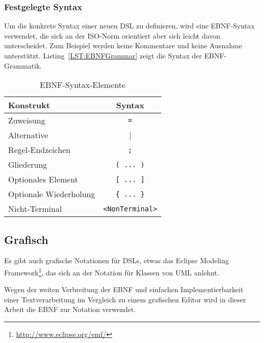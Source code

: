 \documentclass[../InterneDSLs.tex]{subfiles}
\begin{document}
\subsubsection{Festgelegte Syntax}
Um die konkrete Syntax einer neuen DSL zu definieren, wird eine EBNF-Syntax verwendet, die sich an der ISO-Norm orientiert aber sich leicht davon unterscheidet. Zum Beispiel werden keine Kommentare und keine Ausnahme unterstützt. Listing~\ref{LST:EBNFGrammar} zeigt die Syntax der EBNF-Grammatik.

\begin{figure}[ht]

\end{figure}

\begin{table}[ht]
\centering
\begin{tabular}{l|c}
\textbf{Konstrukt}     & \textbf{Syntax}\\\hline
Zuweisung              & \verb|=|\\
Alternative            & |\\
Regel-Endzeichen       & \verb|;|\\
Gliederung             & \verb|( ... )|\\
Optionales Element     & \verb|[ ... ]|\\
Optionale Wiederholung & \verb|{ ... }|\\
Nicht-Terminal         & \verb|<NonTerminal>|\\
\end{tabular}
\caption{EBNF-Syntax-Elemente}
\label{TAB:EBNFSyntax}
\end{table}


\subsection{Grafisch}
Es gibt auch grafische Notationen für DSLs, etwas das Eclipse Modeling Framework\footnote{\url{http://www.eclipse.org/emf/}}, das sich an der Notation für Klassen von UML anlehnt.

Wegen der weiten Verbreitung der EBNF und einfachen Implementierbarkeit einer Textverarbeitung im Vergleich zu einem grafischen Editor wird in dieser Arbeit die EBNF zur Notation verwendet.
\end{document}
